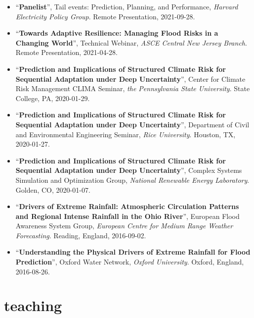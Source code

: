 \documentclass[10pt,oneside]{article}
\begin{document}
\begin{itemize}[label={}]
  \item \enquote{\textbf{Panelist}}, Tail events: Prediction, Planning, and Performance,  \textit{Harvard Electricity Policy Group}. Remote Presentation, 2021-09-28.

  \item \enquote{\textbf{Towards Adaptive Resilience: Managing Flood Risks in a Changing World}}, Technical Webinar,  \textit{ASCE Central New Jersey Branch}. Remote Presentation, 2021-04-28.

  \item \enquote{\textbf{Prediction and Implications of Structured Climate Risk for Sequential Adaptation under Deep Uncertainty}}, Center for Climate Risk Management CLIMA Seminar,  \textit{the Pennsylvania State University}. State College, PA, 2020-01-29.

  \item \enquote{\textbf{Prediction and Implications of Structured Climate Risk for Sequential Adaptation under Deep Uncertainty}}, Department of Civil and Environmental Engineering Seminar,  \textit{Rice University}. Houston, TX, 2020-01-27.

  \item \enquote{\textbf{Prediction and Implications of Structured Climate Risk for Sequential Adaptation under Deep Uncertainty}}, Complex Systems Simulation and Optimization Group,  \textit{National Renewable Energy Laboratory}. Golden, CO, 2020-01-07.

  \item \enquote{\textbf{Drivers of Extreme Rainfall: Atmospheric Circulation Patterns and Regional Intense Rainfall in the Ohio River}}, European Flood Awareness System Group,  \textit{European Centre for Medium Range Weather Forecasting}. Reading, England, 2016-09-02.

  \item \enquote{\textbf{Understanding the Physical Drivers of Extreme Rainfall for Flood Prediction}}, Oxford Water Network,  \textit{Oxford University}. Oxford, England, 2016-08-26.

\end{itemize}


\section{teaching}

\mbox{}\vspace{-\dimexpr\baselineskip\relax}
\end{document}
